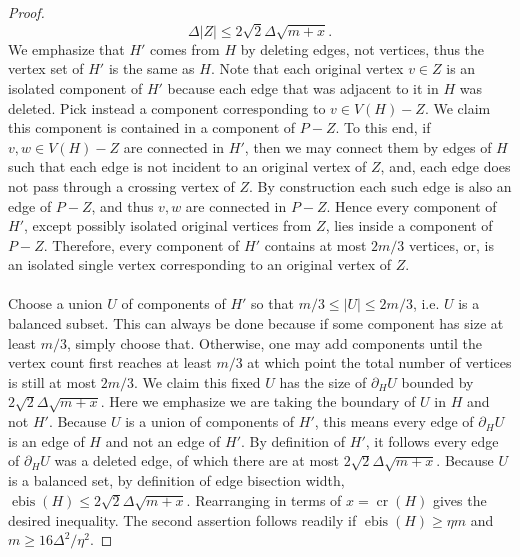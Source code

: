 \documentclass[11pt,a4paper]{amsart}
\theoremstyle{definition}
\theoremstyle{remark}
\DeclareMathOperator{\crn}{cr}
\DeclareMathOperator{\bis}{ebis}
\begin{document}
\begin{proof}
\begin{equation*}
        \Delta |Z|
        \le
        2\sqrt{2} \Delta\sqrt{m+x}.
\end{equation*}
We emphasize that $H'$ comes from $H$ by deleting edges, not vertices, thus the vertex set of $H'$ is the same as $H$.  Note that each original vertex $v \in Z$ is an isolated component of $H'$ because each edge that was adjacent to it in $H$ was deleted.  Pick instead a component corresponding to $v \in V(H)-Z$.  We claim this component is contained in a component of $P-Z$.  To this end, if $v, w \in V(H)-Z$ are connected in $H'$, then we may connect them by edges of $H$ such that each edge is not incident to an original vertex of $Z$, and, each edge does not pass through a crossing vertex of $Z$.  By construction each such edge is also an edge of $P-Z$, and thus $v, w$ are connected in $P-Z$.  Hence every component of $H'$, except possibly isolated original vertices from $Z$, lies inside a component of $P-Z$.  Therefore, every component of $H'$ contains at most $2m/3$ vertices, or, is an isolated single vertex corresponding to an original vertex of $Z$.  
\\
\\
Choose a union $U$ of components of $H'$ so that $m/3\le |U|\le 2m/3$, i.e. $U$ is a balanced subset.  This can always be done because if some component has size at least $m/3$, simply choose that.  Otherwise, one may add components until the vertex count first reaches at least $m/3$ at which point the total number of vertices is still at most $2m/3$.  We claim this fixed $U$ has the size of $\partial_{H} U$ bounded by $2\sqrt{2} \Delta\sqrt{m+x}$.  Here we emphasize we are taking the boundary of $U$ in $H$ and not $H'$.  Because $U$ is a union of components of $H'$, this means every edge of $\partial_{H} U$ is an edge of $H$ and not an edge of $H'$.  By definition of $H'$, it follows every edge of $\partial_{H} U$ was a deleted edge, of which there are at most $2\sqrt{2} \Delta\sqrt{m+x}$.  Because $U$ is a balanced set, by definition of edge bisection width, $\bis(H) \leq 2\sqrt{2} \Delta\sqrt{m+x}$.  Rearranging in terms of $x = \crn(H)$ gives the desired inequality.  The second assertion follows readily if $\bis(H) \geq \eta m$ and $m \geq 16\Delta^{2}/\eta^{2}$.  
\end{proof}
\end{document}
